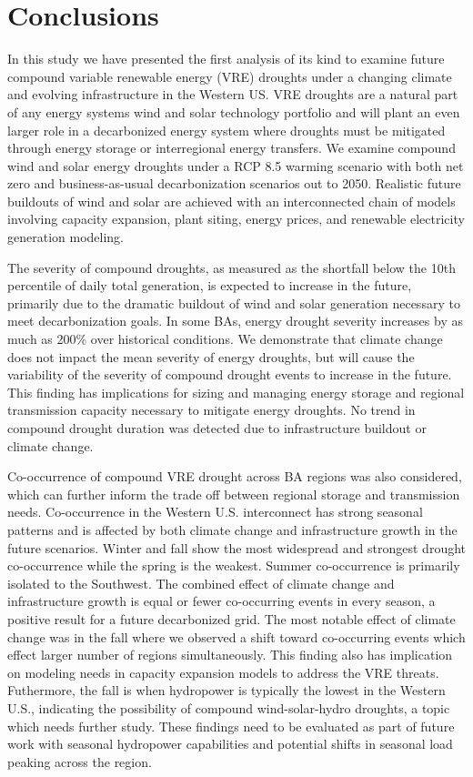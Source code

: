 \documentclass{agujournal2019}
\begin{document}
\section{Conclusions}

In this study we have presented the first analysis of its kind to examine future compound variable renewable energy (VRE) droughts under a changing climate and evolving infrastructure in the Western US. VRE droughts are a natural part of any energy systems wind and solar technology portfolio and will plant an even larger role in a decarbonized energy system where droughts must be mitigated through energy storage or interregional energy transfers. We examine compound wind and solar energy droughts under a RCP 8.5 warming scenario with both net zero and business-as-usual decarbonization scenarios out to 2050. Realistic future buildouts of wind and solar are achieved with an interconnected chain of models involving capacity expansion, plant siting, energy prices, and renewable electricity generation modeling. 

The severity of compound droughts, as measured as the shortfall below the 10th percentile of daily total generation, is expected to increase in the future, primarily due to the dramatic buildout of wind and solar generation necessary to meet decarbonization goals. In some BAs, energy drought severity increases by as much as 200\% over historical conditions. We demonstrate that climate change does not impact the mean severity of energy droughts, but will cause the variability of the severity of compound drought events to increase in the future. This finding has implications for sizing and managing energy storage and regional transmission capacity necessary to mitigate energy droughts. No trend in compound drought duration was detected due to infrastructure buildout or climate change. 

Co-occurrence of compound VRE drought across BA regions was also considered, which can further inform the trade off between regional storage and transmission needs. Co-occurrence in the Western U.S. interconnect has strong seasonal patterns and is affected by both climate change and infrastructure growth in the future scenarios. Winter and fall show the most widespread and strongest drought co-occurrence while the spring is the weakest. Summer co-occurrence is primarily isolated to the Southwest. The combined effect of climate change and infrastructure growth is equal or fewer co-occurring events in every season, a positive result for a future decarbonized grid. The most notable effect of climate change was in the fall where we observed a shift toward co-occurring events which effect larger number of regions simultaneously. This finding also has implication on modeling needs in capacity expansion models to address the VRE threats. Futhermore, the fall is when hydropower is typically the lowest in the Western U.S., indicating the possibility of compound wind-solar-hydro droughts, a topic which needs further study. These findings need to be evaluated as part of future work with seasonal hydropower capabilities and potential shifts in seasonal load peaking across the region. 
\end{document}
